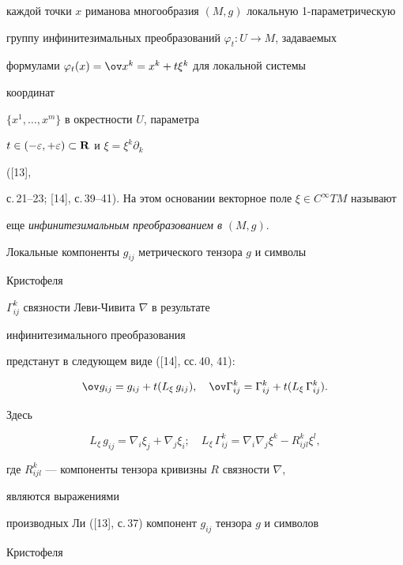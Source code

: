 каждой точки $x$ риманова многообразия $(M,g)$ локальную 1-параметрическую 


группу инфинитезимальных преобразований $\varphi_t:U\to M$, задаваемых 


формулами $\varphi_t(x)=\ov x^k=x^k+t\xi^k$ для локальной системы 


координат 


$\{x^1,\dotsc,x^m\}$ в окрестности $U$, параметра 


$t\in(-\varepsilon,+\varepsilon)\subset \bold R$ и $\xi=\xi^k\partial_k$ 


([13], 


с.\,21--23; [14], с.\,39--41). На этом основании векторное поле $\xi\in 


C^\infty TM$ называют 


еще {\it инфинитезимальным преобразованием в} $(M,g)$. 


 


Локальные компоненты $g_{ij}$ метрического тензора $g$ и символы 


Кристофеля 


$\Gamma^k_{ij}$ связности Леви-Чивита $\nabla$ в результате 


инфинитезимального преобразования 


предстанут в следующем виде ([14], сс.\,40, 41): 


\begin{equation} 


\ov g_{ij}=g_{ij}+t(L_\xi\,g_{ij}),\quad 


\ov\Gamma^k_{ij}=\Gamma^k_{ij}+t(L_\xi\,\Gamma^k_{ij}). 


\end{equation} 


Здесь 


\begin{equation} 


L_\xi\,g_{ij}=\nabla_i\xi_j+\nabla_j\xi_i;\quad 


L_\xi\,\Gamma^k_{ij}=\nabla_i\nabla_j\xi^k-R^k_{ijl}\xi^l, 


\end{equation} 


где $R^k_{ijl}$ --- компоненты тензора кривизны $R$ связности $\nabla$, 


являются выражениями 


производных Ли ([13], с.\,37) компонент $g_{ij}$ тензора $g$ и символов 


Кристофеля 


